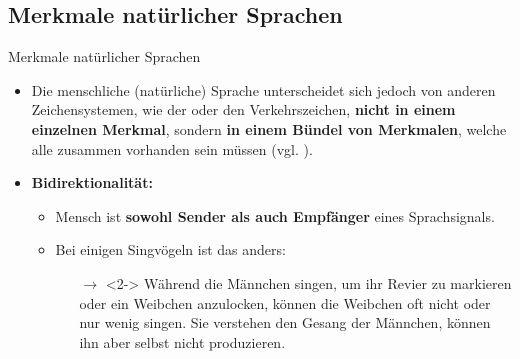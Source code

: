 %
\subsection{Merkmale natürlicher Sprachen}
	
\begin{frame}{Merkmale natürlicher Sprachen}

\begin{itemize}
	\item Die menschliche (natürliche) Sprache unterscheidet sich jedoch von anderen Zeichensystemen, wie der  oder den Verkehrszeichen, \textbf{nicht in einem einzelnen Merkmal}, sondern \textbf{in einem Bündel von Merkmalen}, welche alle zusammen vorhanden sein müssen (vgl. \citet{Hockett60a}).
\end{itemize}

\end{frame}




\begin{frame}

\begin{itemize}
	\item<1-> \bf{Bidirektionalität:}

	\begin{itemize}
		\item[]
		\item<1-> Mensch ist \textbf{sowohl Sender als auch Empfänger} eines Sprachsignals.
		\item[]
		\item<2-> Bei einigen Singvögeln ist das anders:
		
		\begin{itemize}
			\item[]
			\item[$\rightarrow$]<2-> Während die Männchen singen, um ihr Revier zu markieren oder ein Weibchen anzulocken, können die Weibchen oft nicht oder nur wenig singen. Sie verstehen den Gesang der Männchen, können ihn aber selbst nicht produzieren.
		\end{itemize}
			
	\end{itemize}

\end{itemize}

\end{frame}


